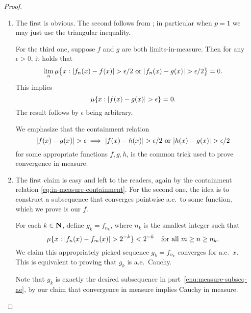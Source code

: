 \begin{proof} \leavevmode
    \begin{enumerate} 
        \item The first is obvious. The second follows from ; in particular when $p=1$ we may just use the triangular inequality.

        For the third one, suppose $f$ and $g$ are both limits-in-measure. Then for any $\epsilon > 0$, it holds that \[
            \lim_n \mu\bigl\{x : \lvert f_n(x) - f(x) \rvert > \epsilon/2 \text{ or }\lvert f_n(x) - g(x) \rvert > \epsilon/2\bigr\} = 0.
        \] This implies \[
            \mu\{x : \lvert f(x) - g(x) \rvert > \epsilon\} = 0.
        \] The result follows by $\epsilon$ being arbitrary.

        We emphasize that the containment relation \begin{equation} \label{eq:in-measure-containment}
            \lvert f(x) - g(x) \rvert > \epsilon \implies \lvert f(x) - h(x) \rvert > \epsilon/2 \text{ or }\lvert h(x) - g(x) \rvert > \epsilon/2
        \end{equation}
        for some appropriate functions $f,g,h$, is the common trick used to prove convergence in measure.
        \item The first claim is easy and left to the readers, again by the containment relation \eqref{eq:in-measure-containment}. For the second one, the idea is to construct a subsequence that converges pointwise a.e.\ to some function, which we prove is our $f$.

        For each $k \in \mathbf{N}$, define $g_k = f_{n_k}$, where $n_k$ is the smallest integer such that \begin{equation} \label{eq:construct-subseq}
             \mu\{x:\lvert f_n(x) - f_m(x) \rvert > 2^{-k}\} < 2^{-k}\quad \text{for all }m\geq n \geq n_k.
        \end{equation}
        We claim this appropriately picked sequence $g_k=f_{n_k}$ converges for a.e.\ $x$. This is equivalent to proving that $g_k$ is a.e.\ Cauchy.

        Note that $g_k$ is exactly the desired subsequence in part~\ref{enu:measure-subseq-ae}, by our claim that convergence in measure implies Cauchy in measure.
        

\end{enumerate}
\end{proof}
